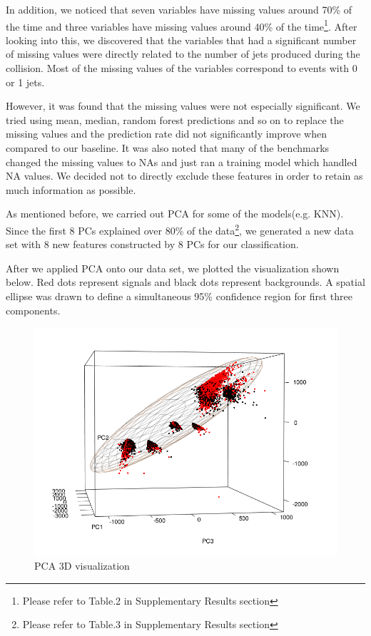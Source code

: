 \documentclass[11pt]{article}
\begin{document}
In addition, we noticed that seven variables have missing values around 70\% of the time and three variables have missing values around 40\% of the time\footnote{Please refer to Table.2 in Supplementary Results section}. After looking into this, we discovered that the variables that had a significant number of missing values were directly related to the number of jets produced during the collision. Most of the missing values of the variables correspond to events with 0 or 1 jets. 

However, it was found that the missing values were not especially significant. We tried using mean, median, random forest predictions and so on to replace the missing values and the prediction rate did not significantly improve when compared to our baseline. It was also noted that many of the benchmarks changed the missing values to NAs and just ran a training model which handled NA values. We decided not to directly exclude these features in order to retain as much information as possible.

As mentioned before, we carried out PCA for some of the models(e.g. KNN). Since the first 8 PCs explained over 80\% of the data\footnote{Please refer to Table.3 in Supplementary Results section}, we generated a new data set with 8 new features constructed by 8 PCs for our classification.

After we applied PCA onto our data set, we plotted the visualization shown below. Red dots represent signals and black dots represent backgrounds. A spatial ellipse was drawn to define a simultaneous 95\% confidence region for first three components.

\begin{figure}[!ht]
\centering
\includegraphics[width=5in]{pca3d.png}
\caption{PCA 3D visualization}
\end{figure}
\end{document}
